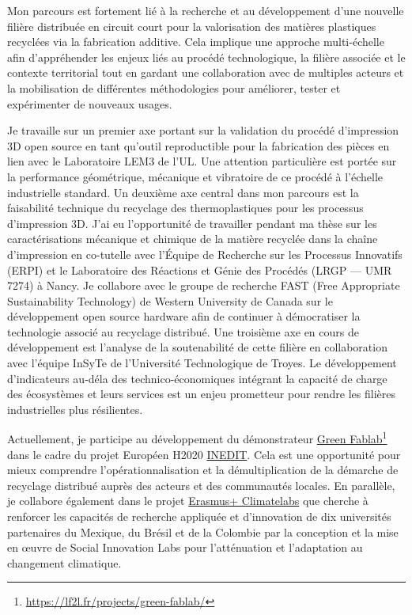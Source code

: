 \documentclass[
  12pt,
  oneside]{book}
\begin{document}
Mon parcours est fortement lié à la recherche et au développement d'une nouvelle filière distribuée en circuit court pour la valorisation des matières plastiques recyclées via la fabrication additive. Cela implique une approche multi-échelle afin d'appréhender les enjeux liés au procédé technologique, la filière associée et le contexte territorial tout en gardant une collaboration avec de multiples acteurs et la mobilisation de différentes méthodologies pour améliorer, tester et expérimenter de nouveaux usages.

Je travaille sur un premier axe portant sur la validation du procédé d'impression 3D open source en tant qu'outil reproductible pour la fabrication des pièces en lien avec le Laboratoire LEM3 de l'UL. Une attention particulière est portée sur la performance géométrique, mécanique et vibratoire de ce procédé à l'échelle industrielle standard.
Un deuxième axe central dans mon parcours est la faisabilité technique du recyclage des thermoplastiques pour les processus d'impression 3D. J'ai eu l'opportunité de travailler pendant ma thèse sur les caractérisations mécanique et chimique de la matière recyclée dans la chaîne d'impression en co-tutelle avec l'Équipe de Recherche sur les Processus Innovatifs (ERPI) et le Laboratoire des Réactions et Génie des Procédés (LRGP --- UMR 7274) à Nancy.
Je collabore avec le groupe de recherche FAST (Free Appropriate Sustainability Technology) de Western University de Canada sur le développement open source hardware afin de continuer à démocratiser la technologie associé au recyclage distribué.
Une troisième axe en cours de développement est l'analyse de la soutenabilité de cette filière en collaboration avec l'équipe InSyTe de l'Université Technologique de Troyes.
Le développement d'indicateurs au-déla des technico-économiques intégrant la capacité de charge des écosystèmes et leurs services est un enjeu prometteur pour rendre les filières industrielles plus résilientes.

Actuellement, je participe au développement du démonstrateur \href{https://lf2l.fr/projects/green-fablab/}{Green Fablab}\footnote{\url{https://lf2l.fr/projects/green-fablab/}} dans le cadre du projet Européen H2020 \href{http://erpi.univ-lorraine.fr/projects/INEDIT/}{INEDIT}.
Cela est une opportunité pour mieux comprendre l'opérationnalisation et la démultiplication de la démarche de recyclage distribué auprès des acteurs et des communautés locales.
En parallèle, je collabore également dans le projet \href{https://erpi.univ-lorraine.fr/fr/projects/Climatelabs/}{Erasmus+ Climatelabs} que cherche à renforcer les capacités de recherche appliquée et d'innovation de dix universités partenaires du Mexique, du Brésil et de la Colombie par la conception et la mise en œuvre de Social Innovation Labs pour l'atténuation et l'adaptation au changement climatique.
\end{document}
